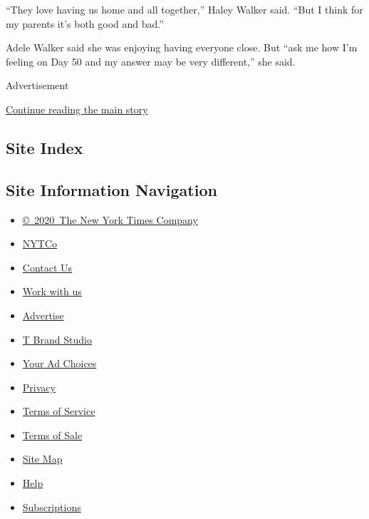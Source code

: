 ``They love having us home and all together,'' Haley Walker said. ``But
I think for my parents it's both good and bad.''

Adele Walker said she was enjoying having everyone close. But ``ask me
how I'm feeling on Day 50 and my answer may be very different,'' she
said.

Advertisement

\protect\hyperlink{after-bottom}{Continue reading the main story}

\hypertarget{site-index}{%
\subsection{Site Index}\label{site-index}}

\hypertarget{site-information-navigation}{%
\subsection{Site Information
Navigation}\label{site-information-navigation}}

\begin{itemize}
\tightlist
\item
  \href{https://help.nytimes3xbfgragh.onion/hc/en-us/articles/115014792127-Copyright-notice}{©~2020~The
  New York Times Company}
\end{itemize}

\begin{itemize}
\tightlist
\item
  \href{https://www.nytco.com/}{NYTCo}
\item
  \href{https://help.nytimes3xbfgragh.onion/hc/en-us/articles/115015385887-Contact-Us}{Contact
  Us}
\item
  \href{https://www.nytco.com/careers/}{Work with us}
\item
  \href{https://nytmediakit.com/}{Advertise}
\item
  \href{http://www.tbrandstudio.com/}{T Brand Studio}
\item
  \href{https://www.nytimes3xbfgragh.onion/privacy/cookie-policy\#how-do-i-manage-trackers}{Your
  Ad Choices}
\item
  \href{https://www.nytimes3xbfgragh.onion/privacy}{Privacy}
\item
  \href{https://help.nytimes3xbfgragh.onion/hc/en-us/articles/115014893428-Terms-of-service}{Terms
  of Service}
\item
  \href{https://help.nytimes3xbfgragh.onion/hc/en-us/articles/115014893968-Terms-of-sale}{Terms
  of Sale}
\item
  \href{https://spiderbites.nytimes3xbfgragh.onion}{Site Map}
\item
  \href{https://help.nytimes3xbfgragh.onion/hc/en-us}{Help}
\item
  \href{https://www.nytimes3xbfgragh.onion/subscription?campaignId=37WXW}{Subscriptions}
\end{itemize}
